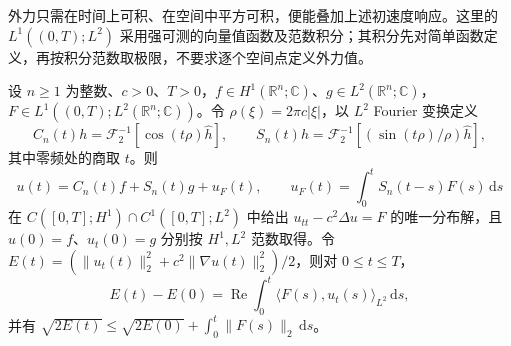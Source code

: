 外力只需在时间上可积、在空间中平方可积，便能叠加上述初速度响应。这里的 \(L^1((0,T);L^2)\) 采用强可测的向量值函数及范数积分；其积分先对简单函数定义，再按积分范数取极限，不要求逐个空间点定义外力值。

\begin{proposition}[非齐次能量解与外力功]\label{b2:prop:11-forced-fourier-energy}
设 \(n\geq1\) 为整数、\(c>0\)、\(T>0\)，\(f\in H^1(\mathbb R^n;\mathbb C)\)、\(g\in L^2(\mathbb R^n;\mathbb C)\)，\(F\in L^1((0,T);L^2(\mathbb R^n;\mathbb C))\)。令 \(\rho(\xi)=2\pi c|\xi|\)，以 \(L^2\) Fourier 变换定义
\[
 C_n(t)h=\mathcal F_2^{-1}[\cos(t\rho)\widehat h],\qquad
 S_n(t)h=\mathcal F_2^{-1}[(\sin(t\rho)/\rho)\widehat h],
\]
其中零频处的商取 \(t\)。则
\[
 u(t)=C_n(t)f+S_n(t)g+u_F(t),\qquad
 u_F(t)=\int_0^tS_n(t-s)F(s)\,\mathrm{d}s
\]
在 \(C([0,T];H^1)\cap C^1([0,T];L^2)\) 中给出 \(u_{tt}-c^2\Delta u=F\) 的唯一分布解，且 \(u(0)=f\)、\(u_t(0)=g\) 分别按 \(H^1,L^2\) 范数取得。令 \(E(t)=(\|u_t(t)\|_2^2+c^2\|\nabla u(t)\|_2^2)/2\)，则对 \(0\leq t\leq T\)，
\begin{equation}\label{b2:eq:11-forced-energy-identity}
 E(t)-E(0)=\operatorname{Re}\int_0^t
              \langle F(s),u_t(s)\rangle_{L^2}\,\mathrm{d}s,
\end{equation}
并有 \(\sqrt{2E(t)}\leq\sqrt{2E(0)}+\int_0^t\|F(s)\|_2\,\mathrm{d}s\)。
\end{proposition}

